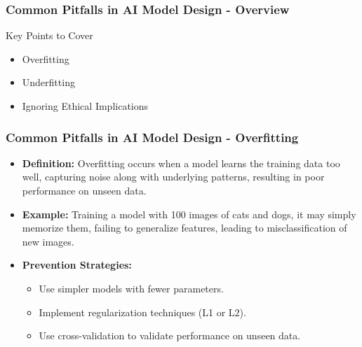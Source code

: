 \documentclass[aspectratio=169]{beamer}
\begin{document}
\begin{frame}[fragile]
    \frametitle{Common Pitfalls in AI Model Design - Overview}
    \begin{block}{Key Points to Cover}
        \begin{itemize}
            \item Overfitting
            \item Underfitting
            \item Ignoring Ethical Implications
        \end{itemize}
    \end{block}
\end{frame}

\begin{frame}[fragile]
    \frametitle{Common Pitfalls in AI Model Design - Overfitting}
    \begin{itemize}
        \item \textbf{Definition:} 
            Overfitting occurs when a model learns the training data too well, capturing noise along with underlying patterns, resulting in poor performance on unseen data.
        \item \textbf{Example:} 
            Training a model with 100 images of cats and dogs, it may simply memorize them, failing to generalize features, leading to misclassification of new images.
        \item \textbf{Prevention Strategies:}
            \begin{itemize}
                \item Use simpler models with fewer parameters.
                \item Implement regularization techniques (L1 or L2).
                \item Use cross-validation to validate performance on unseen data.
            \end{itemize}
    \end{itemize}
\end{frame}
\end{document}
